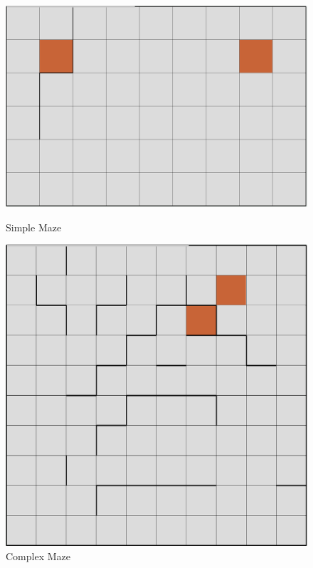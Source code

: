 \documentclass[11pt]{article}
\begin{document}
\begin{figure}[!htb]
   \begin{minipage}{0.4\textwidth}
     \centering
     \includegraphics[width=1.2\linewidth]{../figures/maze1.png}
     \caption{Simple Maze}\label{Fig:maze1}
   \end{minipage}\hfill
   \begin{minipage}{0.4\textwidth}
     \centering
     \includegraphics[width=1\linewidth]{../figures/maze2.png}
     \caption{Complex Maze}\label{Fig:maze2}
   \end{minipage}
\end{figure}\\
\end{document}
